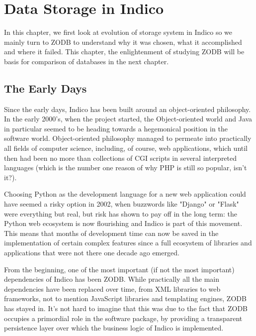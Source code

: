 \chapter{Data Storage in Indico}

\par In this chapter, we first look at evolution of storage system in Indico so we mainly turn to ZODB to understand why it was chosen, what it accomplished and where it failed. This chapter, the enlightenment of studying ZODB will be basis for comparison of databases in the next chapter.

\section{The Early Days}

\par Since the early days, Indico has been built around an object-oriented philosophy. In the early 2000's, when the project started, the Object-oriented world and Java in particular seemed to be heading towards a hegemonical position in the software world. Object-oriented philosophy managed to permeate into practically all fields of computer science, including, of course, web applications, which until then had been no more than collections of CGI scripts in several interpreted languages (which is the number one reason of why PHP is still so popular, isn't it?).

\par Choosing Python as the development language for a new web application could have seemed a risky option in 2002, when buzzwords like "Django" or "Flask" were everything but real, but risk has shown to pay off in the long term: the Python web ecosystem is now flourishing and Indico is part of this movement. This means that months of development time can now be saved in the implementation of certain complex features since a full ecosystem of libraries and applications that were not there one decade ago emerged.

\par From the beginning, one of the most important (if not the most important) dependencies of Indico has been ZODB. While practically all the main dependencies have been replaced over time, from XML libraries to web frameworks, not to mention JavaScript libraries and templating engines, ZODB has stayed in. It's not hard to imagine that this was due to the fact that ZODB occupies a primordial role in the software package, by providing a transparent persistence layer over which the business logic of Indico is implemented.


